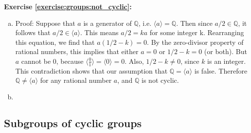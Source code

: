 \noindent\textbf{Exercise \ref{exercise:groups:not_cyclic}:}
\begin{enumerate}[(a)]
\item
Proof:
Suppose that $a$ is a generator of $\mathbb{Q}$, i.e. $\langle a \rangle = \mathbb{Q}$.  Then since $a/2 \in  \mathbb{Q}$, it follows that  $a/2 \in \langle a \rangle$. This means $a/2 =ka$ for some integer k.  Rearranging this equation, we find that $a(1/2-k)=0$.  By the zero-divisor property of rational numbers, this implies that either $a=0$ or $1/2-k = 0$ (or both). But $a$ cannot be 0, because $\langle \frac{0}{1} \rangle = \langle 0 \rangle = 0$.  Also, $1/2-k \neq 0$, since $k$ is an integer.  This contradiction shows that  our assumption that ${\mathbb Q} = \langle a \rangle$ is false. Therefore ${\mathbb Q} \neq \langle a \rangle$ for any rational number $a$, and ${\mathbb Q}$ is not cyclic.

\item
\end{enumerate}

 
\subsection{Subgroups of cyclic groups}
